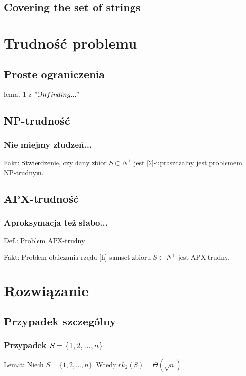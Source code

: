 \documentclass{beamer}
\begin{document}
	\subsection{Covering the set of strings}
		\begin{frame}
		\end{frame}
		
\section{Trudność problemu}
	\subsection{Proste ograniczenia}
		\begin{frame}
			lemat 1 z $"On finding..."$
		\end{frame}
		
	\subsection{NP-trudność}
		\begin{frame} \frametitle{Nie miejmy złudzeń...}
			Fakt: Stwierdzenie, czy dany zbiór $ S \subset N^{+} $ jest [2]-upraszczalny jest problemem NP-trudnym.
		\end{frame}
		
	\subsection{APX-trudność}
		\begin{frame} \frametitle{Aproksymacja też słabo...}
			Def.: Problem APX-trudny
		
			Fakt: Problem obliczania rzędu [h]-sumset zbioru $ S \subset N^{+} $ jest APX-trudny.
		\end{frame}
		
\section{Rozwiązanie}
	\subsection{Przypadek szczególny}
		\begin{frame} \frametitle{Przypadek $ S = \lbrace 1,2,...,n \rbrace $}
			Lemat: Niech $ S = \lbrace 1,2,...,n \rbrace $. Wtedy $ rk_{2}(S) = \Theta(\sqrt{n}) $
		\end{frame}
		
\end{document}
